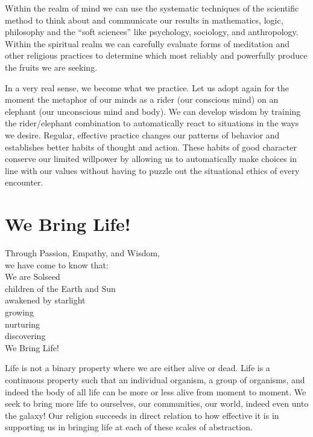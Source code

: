 \documentclass[ebook,12pt,openany,twoside]{memoir}
\newcommand{\tab}{\hspace*{2em}}
\newcommand{\imagefacingchapter}[1]{
  \cleartoverso
  \clearpage \null
  \thispagestyle{cleared}
  \AddToShipoutPictureBG*{%
    \AtStockLowerLeft{%
      \texttt{[image: \#1]}
    }
  }
  \clearpage
}
\begin{document}
Within the realm of mind we can use the systematic techniques of the scientific
method to think about and communicate our results in mathematics, logic,
philosophy and the ``soft sciences'' like psychology, sociology, and
anthropology. Within the spiritual realm we can carefully evaluate forms of
meditation and other religious practices to determine which most reliably and
powerfully produce the fruits we are seeking.

In a very real sense, we become what we practice. Let us adopt again for the
moment the metaphor of our minds as a rider (our conscious mind) on an elephant
(our unconscious mind and body). We can develop wisdom by training the
rider/elephant combination to automatically react to situations in the ways we
desire. Regular, effective practice changes our patterns of behavior and
establishes better habits of thought and action.  These habits of good character
conserve our limited willpower by allowing us to automatically make choices in
line with our values without having to puzzle out the situational ethics of
every encounter.




\imagefacingchapter{images/WeBringLife}
\chapter{We Bring Life!}
\setlength\epigraphwidth{2.8in}
\epigraph{
  Through Passion, Empathy, and Wisdom,\\
  we have come to know that:\\
  \tab We are Solseed\\
  \tab children of the Earth and Sun\\
  \tab awakened by starlight\\
  \tab growing\\
  \tab nurturing\\
  \tab discovering\\
  \tab We Bring Life!
}{}

Life is not a binary property where we are either alive or dead. Life is a
continuous property such that an individual organism, a group of organisms, and
indeed the body of all life can be more or less alive from moment to moment. We
seek to bring more life to ourselves, our communities, our world, indeed even
unto the galaxy! Our religion succeeds in direct relation to how effective it
is in supporting us in bringing life at each of these scales of abstraction.
\end{document}
